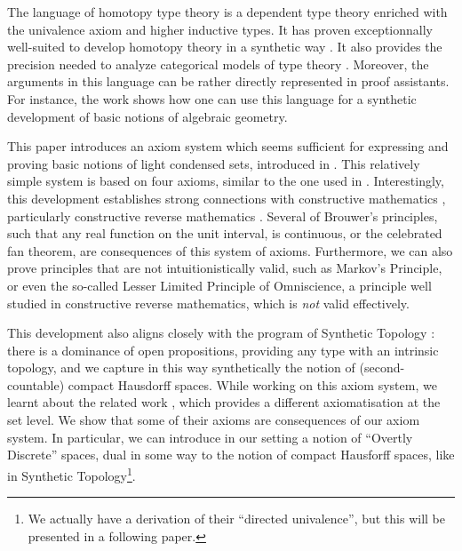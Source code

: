 The language of homotopy type theory is a  dependent type theory enriched with the univalence axiom and higher inductive types. It has proven exceptionnally well-suited to
develop homotopy theory in a synthetic way \cite{hott}. It also provides
the precision needed to analyze categorical models of type theory \cite{vanderweide2024} . Moreover,
the arguments in this language can be rather directly represented in proof assistants. For instance, the work \cite{draft} shows how one can use
this language for a synthetic development of basic notions of algebraic geometry. 

This paper introduces
an axiom system which seems sufficient for expressing and proving basic notions of light condensed
sets, introduced in \cite{Scholze}.
This relatively simple system is based on four axioms, similar to the one used
in \cite{draft}. Interestingly, this development establishes strong connections with constructive mathematics \cite{Bishop},
particularly constructive reverse mathematics \cite{ReverseMathsBishop,HannesDiener}. Several of Brouwer's principles, such that
any real function on the unit interval, is continuous, or the celebrated fan theorem, are consequences of this system
of axioms. Furthermore, we can also prove principles that are not intuitionistically valid, such as Markov's Principle,
or even the so-called Lesser Limited Principle of Omniscience, a principle well studied in constructive reverse mathematics,
which is {\em not} valid effectively.

This development also aligns closely with the program of Synthetic
Topology \cite{SyntheticTopologyEscardo,SyntheticTopologyLesnik}:
there is a dominance of open propositions, providing any type with an intrinsic
topology, and we capture in this way synthetically the notion of (second-countable) compact Hausdorff spaces.
While working on this axiom system, we learnt about the related work \cite{bc24}, which provides a different axiomatisation
at the set level. We show that some of their axioms are consequences of our axiom system. In particular, we can introduce
in our setting a notion of ``Overtly Discrete'' spaces, dual in some way to the notion of compact Hausforff spaces, like
in Synthetic Topology\footnote{We actually have a
derivation of their ``directed univalence'', but this will be presented in a following paper.}.

